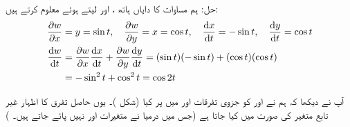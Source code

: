 حل:\quad
ہم مساوات  کا دایاں ہاتھ  ،  اور  لیتے ہوئے معلوم کرتے ہیں:
\begin{align*}
\frac{\partial w}{\partial x}&=y=\sin t,\quad \frac{\partial w}{\partial y}=x=\cos t,\quad \frac{\dif x}{\dif t}=-\sin t,\quad \frac{\dif y}{\dif t}=\cos t\\
\frac{\dif w}{\dif t}&=\frac{\partial w}{\partial x}\frac{\dif x}{\dif t}+\frac{\partial w}{\partial y}\frac{\dif y}{\dif t}=(\sin t)(-\sin t)+(\cos t)(\cos t)\\
&=-\sin^2t+\cos^2t=\cos 2t
\end{align*}

آپ نے دیکھا کہ ہم نے  اور  کو جزوی تفرقات  اور  میں پر کیا (شکل )۔ یوں حاصل تفرق   کا اظہار غیر تابع متغیر  کی صورت میں   کیا جاتا ہے (جس میں  درمیا نے    متغیرات  اور  نہیں پائے  جاتے ہیں۔ )

